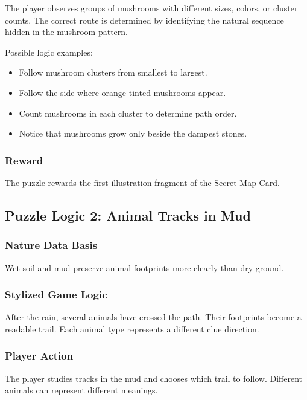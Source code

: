 \documentclass[12pt]{article}
\begin{document}
The player observes groups of mushrooms with different sizes, colors, or cluster counts. The correct route is determined by identifying the natural sequence hidden in the mushroom pattern.

Possible logic examples:

\begin{itemize}[leftmargin=*]
    \item Follow mushroom clusters from smallest to largest.
    \item Follow the side where orange-tinted mushrooms appear.
    \item Count mushrooms in each cluster to determine path order.
    \item Notice that mushrooms grow only beside the dampest stones.
\end{itemize}

\subsubsection{Reward}

The puzzle rewards the first illustration fragment of the Secret Map Card.

\subsection{Puzzle Logic 2: Animal Tracks in Mud}

\subsubsection{Nature Data Basis}

Wet soil and mud preserve animal footprints more clearly than dry ground.

\subsubsection{Stylized Game Logic}

After the rain, several animals have crossed the path. Their footprints become a readable trail. Each animal type represents a different clue direction.

\subsubsection{Player Action}

The player studies tracks in the mud and chooses which trail to follow. Different animals can represent different meanings.
\end{document}
